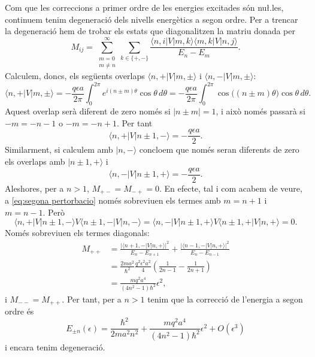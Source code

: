 \documentclass[12pt]{article}
\numberwithin{table}{section}
\numberwithin{figure}{section}
\newcommand{\abs}[1]{\lvert #1 \rvert}
\newcommand{\ket}[1]{\vert {#1} \rangle}
\newcommand{\bra}[1]{\langle #1 \vert}
\begin{document}
Com que les correccions a primer ordre de les energies excitades són nu\l.les, continuem tenim degeneració dels nivells energètics a segon ordre. Per a trencar la degeneració hem de trobar els estats que diagonalitzen la matriu donada per
\begin{equation} \label{eq:segona pertorbacio}
	M_{ij} = \sum_{\substack{m = 0 \\ m \neq n}}^{\infty} \sum_{k \in \{+,-\}} \frac{\bra{n,i}V\ket{m,k} \bra{m,k}V\ket{n,j}}{E_n - E_m}. 
\end{equation}
Calculem, doncs, els següents overlaps \( \bra{n,+}V\ket{m,\pm} \) i \( \bra{n,-}V\ket{m,\pm} \):
\begin{equation*}
	\bra{n,+} V \ket{m,\pm} = -\frac{q\epsilon a}{2\pi} \int_0^{2\pi} e^{i(n \pm m)\theta} \cos{\theta} \,d\theta = -\frac{q\epsilon a}{2\pi} \int_0^{2\pi} \cos{\big((n\pm m)\theta\big)} \cos{\theta} \,d\theta.
\end{equation*}
Aquest overlap serà diferent de zero només si \( \abs{n \pm m} = 1 \), i això només passarà si \( -m = -n -1 \) o \( -m  = -n+1 \). Per tant
\begin{equation*}
	\bra{n,+} V \ket{n \pm	1,-} = -\frac{q\epsilon a}{2}.
\end{equation*}
Similarment, si calculem amb \( \ket{n,-} \) concloem que només seran diferents de zero els overlaps amb \( \ket{n \pm 1, +} \) i
\begin{equation*}
	\bra{n,-} V \ket{n \pm	1,+} = -\frac{q\epsilon a}{2}.
\end{equation*}
Aleshores, per a \( n > 1 \), \( M_{+-} = M_{-+} = 0 \). En efecte, tal i com acabem de veure, a \cref{eq:segona pertorbacio} només sobreviuen els termes amb \( m = n+1 \) i \( m = n-1 \). Però
\begin{equation*}
	\bra{n,+}V\ket{n\pm1,-}V\bra{n\pm1,-}V\ket{n,-} = \bra{n,-}V\ket{n\pm1,+}V\bra{n\pm1,+}V\ket{n,+} = 0.
\end{equation*}
Només sobreviuen els termes diagonals:
\begin{align*}
	M_{++} &= \frac{\abs{\bra{n+1,-}V\ket{n,+}}^2}{E_n - E_{n+1}} + \frac{\abs{\bra{n-1,-}V\ket{n,+}}^2}{E_n - E_{n-1}} \\
				 &= \frac{2ma^2}{\hbar^2}\frac{q^2\epsilon^2a^2}{4}\left(\frac{1}{2n - 1} - \frac{1}{2n + 1}\right) \\
				 &= \frac{mq^2a^4}{(4n^2 - 1)\hbar^2}\epsilon^2,
\end{align*}
i \( M_{--} = M_{++} \). Per tant, per a \( n > 1 \) tenim que la correcció de l'energia a segon ordre és
\begin{equation*}
	E_{\pm n}(\epsilon) = \frac{\hbar^2}{2ma^2n^2} + \frac{mq^2a^4}{(4n^2 - 1)\hbar^2}\epsilon^2 + O(\epsilon^3) 
\end{equation*}
i encara tenim degeneració.
\end{document}
